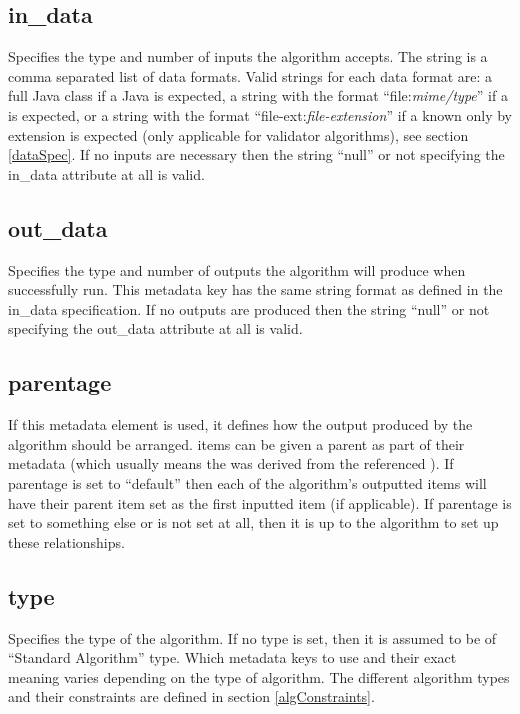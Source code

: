 \subsection*{in\_data}
Specifies the type and number of  inputs the
algorithm accepts. The string is a comma separated list of data formats. Valid strings
for each data format are: a full Java class if a Java  is
expected, a string with the format ``file:\textit{mime/type}'' if a
 is expected, or a string with the format
``file-ext:\textit{file-extension}'' if a  known only by
extension is expected (only applicable for validator algorithms), see section
\ref{dataSpec}. If no  inputs are necessary then the string
``null'' or not specifying the in\_data attribute at all is valid.

\subsection*{out\_data}
Specifies the type and number of  outputs
the algorithm will produce when successfully run. This metadata key has the same string format
as defined in the in\_data specification. If no  outputs are
produced then the string ``null'' or not specifying the out\_data attribute at
all is valid.

\subsection*{parentage}
If this metadata element is used, it defines how the output 
produced by the algorithm should be arranged.  items can be
given a parent as part of their metadata (which usually means the 
was derived from the referenced ). If parentage is set to
``default'' then each of the algorithm's outputted  items will have
their parent  item set as the first inputted  item (if
applicable). If parentage is set to something else or is not set at all, then
it is up to the algorithm to set up these relationships.

\subsection*{type}
Specifies the type of the algorithm. If no type is set, then
it is assumed to be of ``Standard Algorithm'' type. Which metadata keys to use and
their exact meaning varies depending on the type of algorithm. The different
algorithm types and their constraints are defined in section
\ref{algConstraints}.

